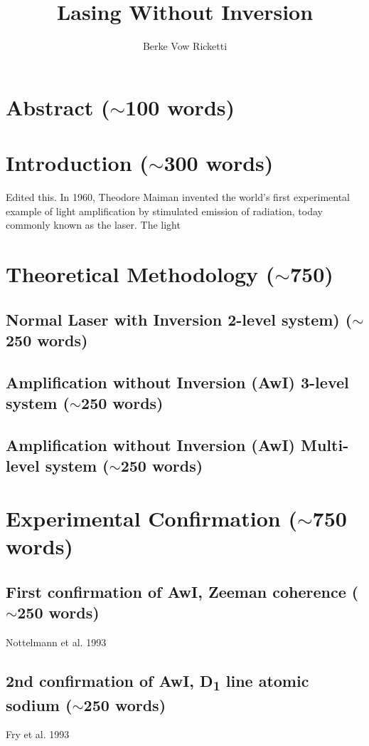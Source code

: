 \documentclass{article}
\title{Lasing Without Inversion}
\author{Berke Vow Ricketti}
\begin{document}
\maketitle{}




\section{Abstract ($\sim$100 words)}

\section{Introduction ($\sim$300 words)}
Edited this.
In 1960, Theodore Maiman invented the world's first experimental example of light amplification by stimulated emission of radiation, today commonly known as the laser. The light 

\cite{Harris1989,Scully1994,Kocharovskaya1986,Mandel1993,Kilin2008,Ukhanov1999,Zhu1992,Marthaler2011,Mompart2000}
\section{Theoretical Methodology ($\sim$750)}
\subsection{Normal Laser with Inversion 2-level system) ($\sim$250 words)}
\subsection{Amplification without Inversion (AwI) 3-level system ($\sim$250 words)}
\subsection{Amplification without Inversion (AwI) Multi-level system ($\sim$250 words)}

\section{Experimental Confirmation ($\sim$750 words)}
\subsection{First confirmation of AwI, Zeeman coherence ($\sim$250 words)}
Nottelmann et al. 1993 \cite{Nottelmann1993}
\subsection{2nd confirmation of AwI, D\textsubscript{1} line atomic sodium ($\sim$250 words)}
Fry et al. 1993 \cite{PhysRevLett.70.3235}
\end{document}
